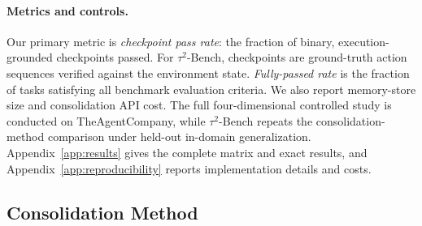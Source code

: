 \paragraph{Metrics and controls.}
Our primary metric is \emph{checkpoint pass rate}: the fraction of binary,
execution-grounded checkpoints passed. For $\tau^2$-Bench, checkpoints are
ground-truth action sequences verified against the environment state.
\emph{Fully-passed rate} is the fraction of tasks satisfying all benchmark
evaluation criteria. We also report memory-store size and consolidation API
cost. The full four-dimensional controlled study is conducted on
TheAgentCompany, while $\tau^2$-Bench repeats the consolidation-method
comparison under held-out in-domain generalization.
Appendix~\ref{app:results} gives the complete matrix and exact results, and
Appendix~\ref{app:reproducibility} reports implementation details and costs.

\subsection{Consolidation Method}
\label{sec:exp1}

